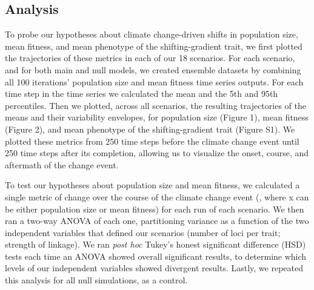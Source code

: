 \documentclass[9pt,twocolumn,twoside,lineno]{pnas-new}
\begin{document}
{\subsection*{Analysis}

To probe our hypotheses about climate change-driven shifts in population size, 
mean fitness, and mean phenotype of the shifting-gradient trait, we first plotted the 
trajectories of these metrics in each of our 18 scenarios. For each scenario, and 
for both main and null models, we created ensemble datasets by combining all 100 
iterations’ population size and mean fitness time series outputs. For each time step 
in the time series we calculated the mean and the 5th and 95th percentiles. Then we 
plotted, across all scenarios, the resulting trajectories of the means and their 
variability envelopes, for population size (Figure 1), mean fitness (Figure 2), and 
mean phenotype of the shifting-gradient trait (Figure S1). We plotted these metrics 
from 250 time steps before the climate change event until 250 time steps after 
its completion, allowing us to visualize the onset, course, and aftermath of the 
change event. 


To test our hypotheses about population size and mean fitness, we calculated a single 
metric of change over the course of the climate change event (, where x can be 
either population size or mean fitness) for each run of each scenario. We then ran a 
two-way ANOVA of each one, partitioning variance as a function of the two independent 
variables that defined our scenarios (number of loci per trait; strength of linkage). 
We ran \textit{post hoc} Tukey’s honest significant difference (HSD) tests each time an ANOVA 
showed overall significant results, to determine which levels of our independent 
variables showed divergent results. Lastly, we repeated this analysis for all null 
simulations, as a control.


}
\end{document}
